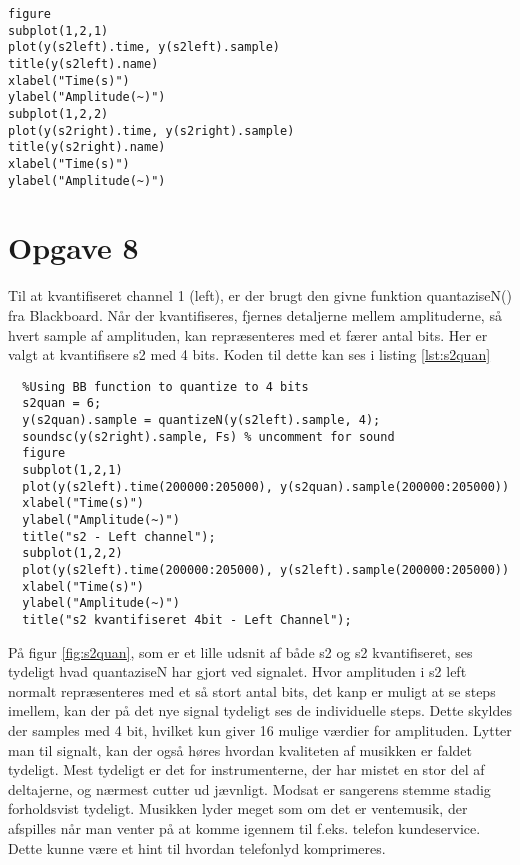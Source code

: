 \documentclass[../main.tex]{subfiles}
\begin{document}
\begin{lstlisting}[caption={Kode for plot af s2left og s2 right}, label=lst:s2]
figure
subplot(1,2,1)
plot(y(s2left).time, y(s2left).sample)
title(y(s2left).name)
xlabel("Time(s)")
ylabel("Amplitude(~)")
subplot(1,2,2)
plot(y(s2right).time, y(s2right).sample)
title(y(s2right).name)
xlabel("Time(s)")
ylabel("Amplitude(~)")
\end{lstlisting}



\section{Opgave 8}

Til at kvantifiseret channel 1 (left), er der brugt den givne funktion quantaziseN() fra Blackboard. Når der kvantifiseres, fjernes detaljerne mellem amplituderne, så hvert sample af amplituden, kan repræsenteres med et færer antal bits. Her er valgt at kvantifisere s2 med 4 bits. Koden til dette kan ses i listing \ref{lst:s2quan}

\begin{lstlisting}[caption={Kvantifisering af s2}label=lst:s2quan]
  %% Exercise 8
  %Using BB function to quantize to 4 bits
  s2quan = 6;
  y(s2quan).sample = quantizeN(y(s2left).sample, 4);
  soundsc(y(s2right).sample, Fs) % uncomment for sound
  figure
  subplot(1,2,1)
  plot(y(s2left).time(200000:205000), y(s2quan).sample(200000:205000))
  xlabel("Time(s)")
  ylabel("Amplitude(~)")
  title("s2 - Left channel");
  subplot(1,2,2)
  plot(y(s2left).time(200000:205000), y(s2left).sample(200000:205000))
  xlabel("Time(s)")
  ylabel("Amplitude(~)")
  title("s2 kvantifiseret 4bit - Left Channel");
\end{lstlisting}


På figur \ref{fig:s2quan}, som er et lille udsnit af både s2 og s2 kvantifiseret, ses tydeligt hvad quantaziseN har gjort ved signalet. Hvor amplituden i s2 left normalt repræsenteres med et så stort antal bits, det kanp er muligt at se steps imellem, kan der på det nye signal tydeligt ses de individuelle steps. Dette skyldes der samples med 4 bit, hvilket kun giver 16 mulige værdier for amplituden. Lytter man til signalt, kan der også høres hvordan kvaliteten af musikken er faldet tydeligt. Mest tydeligt er det for instrumenterne, der har mistet en stor del af deltajerne, og nærmest cutter ud jævnligt. Modsat er sangerens stemme stadig forholdsvist tydeligt. Musikken lyder meget som om det er ventemusik, der afspilles når man venter på at komme igennem til f.eks.  telefon kundeservice. Dette kunne være et hint til hvordan telefonlyd komprimeres.
\end{document}
